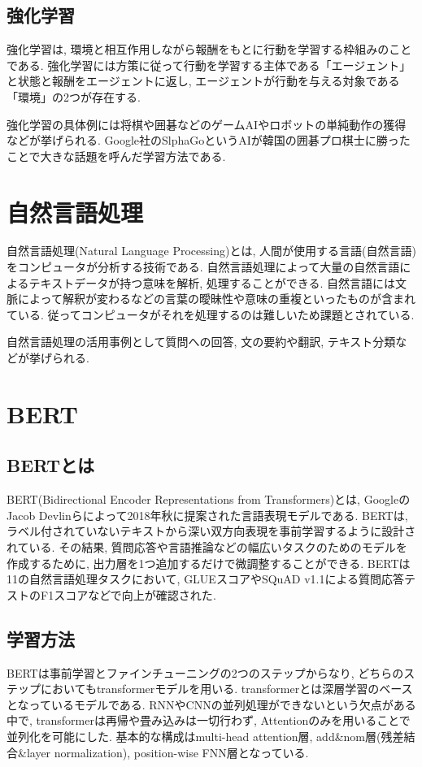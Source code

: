 \subsection{強化学習}
強化学習は, 環境と相互作用しながら報酬をもとに行動を学習する枠組みのことである. 強化学習には方策に従って行動を学習する主体である「エージェント」と状態と報酬をエージェントに返し, エージェントが行動を与える対象である「環境」の2つが存在する. 

強化学習の具体例には将棋や囲碁などのゲームAIやロボットの単純動作の獲得などが挙げられる. Google社のSlphaGoというAIが韓国の囲碁プロ棋士に勝ったことで大きな話題を呼んだ学習方法である. 


\section{自然言語処理}
自然言語処理(Natural Language Processing)とは, 人間が使用する言語(自然言語)をコンピュータが分析する技術である. 自然言語処理によって大量の自然言語によるテキストデータが持つ意味を解析, 処理することができる. 
自然言語には文脈によって解釈が変わるなどの言葉の曖昧性や意味の重複といったものが含まれている. 従ってコンピュータがそれを処理するのは難しいため課題とされている. 

自然言語処理の活用事例として質問への回答, 文の要約や翻訳, テキスト分類などが挙げられる. 



\section{BERT}
\subsection{BERTとは}
BERT(Bidirectional Encoder Representations from Transformers)\cite{bert}とは, GoogleのJacob Devlinらによって2018年秋に提案された言語表現モデルである. BERTは, ラベル付されていないテキストから深い双方向表現を事前学習するように設計されている. その結果, 質問応答や言語推論などの幅広いタスクのためのモデルを作成するために, 出力層を1つ追加するだけで微調整することができる. BERTは11の自然言語処理タスクにおいて, GLUEスコアやSQuAD v1.1による質問応答テストのF1スコアなどで向上が確認された\cite{bert}. 

\subsection{学習方法}
BERTは事前学習とファインチューニングの2つのステップからなり, どちらのステップにおいてもtransformerモデルを用いる. transformerとは深層学習のベースとなっているモデルである. RNNやCNNの並列処理ができないという欠点がある中で, transformerは再帰や畳み込みは一切行わず, Attentionのみを用いることで並列化を可能にした. 基本的な構成はmulti-head attention層, add\&nom層(残差結合\&layer normalization), position-wise FNN層となっている. 

